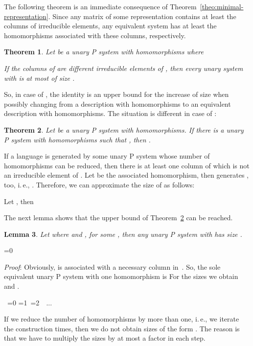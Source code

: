 \documentclass[copyright]{eptcs}
\makeatletter
\newtheorem{theorem}{Theorem}
\newtheorem{lemma}[theorem]{Lemma}
\newcounter{d@proof}\let\thed@proof\relax\setcounter{d@proof}{0}
\newcommand*{\qed}{}
\newenvironment{proof}{\ifnum \value{d@proof}=0{\setcounter{claim}{0}}\else\fi
  \stepcounter{d@proof}\par\noindent
  {\rmfamily\itshape\mdseries Proof\/}:\hspace{\labelsep}\ignorespaces}{\addtocounter{d@proof}{-1}\mbox{}\nolinebreak\hfill~\ifnum \value{d@proof}=0{\qed}\else
    \ifnum \value{d@proof}=1{\qed\nolinebreak\,\nolinebreak\qed}\else
      \ifnum \value{d@proof}=2{\qed\nolinebreak\,\nolinebreak\qed
          \nolinebreak\,\nolinebreak\qed}\else
        {\qed\nolinebreak...\nolinebreak\qed}\fi\fi\fi
  \medbreak
}
\newenvironment{proof*}{\ifnum \value{d@proof}=0{\setcounter{claim}{0}}\else\fi
  \par\noindent
  {\rmfamily\itshape\mdseries Proof\/}:\hspace{\labelsep}\ignorespaces}{
}
\makeatother
\begin{document}
The following theorem is an immediate consequence of Theorem~\ref {theo:minimal-representation}. Since any matrix of some representation
contains at least the columns of irreducible elements, any equivalent system
has at least the homomorphisms associated with these columns, respectively.

\begin{theorem}
Let  be a unary P system with  homomorphisms where 

If the columns of  are
different irreducible elements of , then every unary system  with  is at most of size .
\end{theorem}

So, in case of , the identity is an upper bound for the
increase of size when possibly changing from a description with 
homomorphisms to an equivalent description with 
homomorphisms. The situation is different in case of :

\begin{theorem}
\label{theo:upper-bound} Let  be a unary P system with 
homomorphisms. If there is a unary P system  with 
homomorphisms such that , then .
\end{theorem}

\begin{proof*}
If a language  is generated by some unary P system 
whose number of homomorphisms can be reduced, then there is at least one
column of  which is not an irreducible element of . Let  be the associated
homomorphism, then 
generates , too, i.\,e., . Therefore, we can
approximate the size of  as follows:

Let , then 

\end{proof*}

The next lemma shows that the upper bound of Theorem~\ref{theo:upper-bound}
can be reached.

\begin{lemma}
\label{lem_lower-bound} Let  where  and , for
some , then any unary P system  with  has size .
\end{lemma}

\begin{proof}
Obviously,  is associated with a necessary column in~. So, the sole equivalent unary P system with one homomorphism is 
For the sizes we obtain  and .
\end{proof}

If we reduce the number of homomorphisms by more than one, i.\,e., we iterate
the construction  times, then we do not obtain sizes of the form . The reason is that we have to
multiply the sizes by at most a factor  in each
step.
\end{document}
